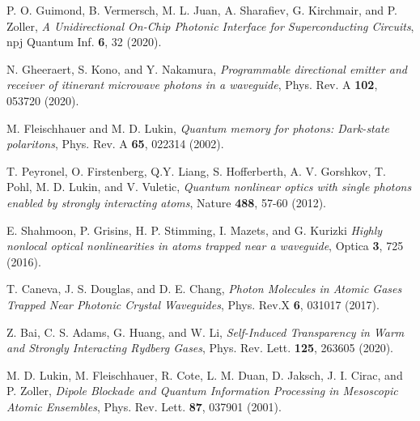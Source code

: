 \documentclass[pra,twocolumn,showpacs,preprintnumbers,amsmath,amssymb]{revtex4-1}
\begin{document}
\begin{thebibliography}{99}


 P. O. Guimond, B. Vermersch, M. L. Juan, A. Sharafiev, G. Kirchmair, and P. Zoller, \textit{A Unidirectional On-Chip Photonic Interface for Superconducting Circuits}, npj Quantum Inf.  {\bf 6}, 32 (2020).

 N. Gheeraert, S. Kono, and Y. Nakamura, \textit{Programmable directional emitter and receiver of itinerant microwave photons in a waveguide}, Phys. Rev. A  {\bf 102}, 053720 (2020).


 M. Fleischhauer and M. D. Lukin, \textit{Quantum memory for photons: Dark-state polaritons},   Phys. Rev. A    {\bf 65}, 022314  (2002).  





 T. Peyronel, O. Firstenberg, Q.Y. Liang, S. Hofferberth, A. V. Gorshkov, T. Pohl, M. D. Lukin, and V. Vuletic, \textit{Quantum nonlinear optics with single photons
enabled by strongly interacting atoms},   Nature    {\bf 488}, 57-60 (2012).





 E. Shahmoon, P. Grisins, H. P. Stimming, I. Mazets, and G. Kurizki \textit{Highly nonlocal optical nonlinearities in atoms trapped near a waveguide}, Optica {\bf 3},  725 (2016).


 T. Caneva,  J. S. Douglas,  and D. E. Chang, \textit{Photon Molecules in Atomic Gases Trapped Near Photonic Crystal Waveguides}, Phys. Rev.X {\bf 6}, 031017 (2017).

 Z. Bai, C. S. Adams, G. Huang, and W. Li, \textit{Self-Induced Transparency in Warm and Strongly Interacting Rydberg Gases},  Phys. Rev. Lett. {\bf 125}, 263605 (2020).

 M. D. Lukin, M. Fleischhauer, R. Cote, L. M. Duan, D. Jaksch, J. I. Cirac, and P. Zoller, \textit{Dipole Blockade and Quantum Information Processing in Mesoscopic Atomic Ensembles}, Phys. Rev. Lett. {\bf 87}, 037901 (2001).



\end{thebibliography}
\end{document}

